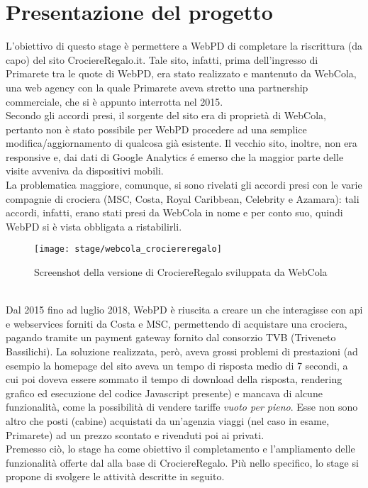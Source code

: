 \section{Presentazione del progetto}
L'obiettivo di questo stage è permettere a WebPD di completare la riscrittura (da capo) del sito CrociereRegalo.it. Tale sito, infatti, prima dell'ingresso di Primarete tra le quote di WebPD, era stato realizzato e mantenuto da WebCola, una web agency con la quale Primarete aveva stretto una partnership commerciale, che si è appunto interrotta nel 2015.\\
Secondo gli accordi presi, il sorgente del sito era di proprietà di WebCola, pertanto non è stato possibile per WebPD procedere ad una semplice modifica/aggiornamento di qualcosa già esistente. Il vecchio sito, inoltre, non era responsive e, dai dati di Google Analytics é emerso che la maggior parte delle visite avveniva da dispositivi mobili. \\
La problematica maggiore, comunque, si sono rivelati gli accordi presi con le varie compagnie di crociera (MSC, Costa, Royal Caribbean, Celebrity e Azamara): tali accordi, infatti, erano stati presi da WebCola in nome e per conto suo, quindi WebPD si è vista obbligata a ristabilirli.
\begin{figure}[!h] 
	\centering 
	\texttt{[image: stage/webcola\_crociereregalo]} 
	\caption{Screenshot della versione di CrociereRegalo sviluppata da WebCola}
\end{figure}\\
Dal 2015 fino ad luglio 2018, WebPD è riuscita a creare un \bookingEngine che interagisse con \Gls{api} e \glspl{webservice} forniti da Costa e MSC, permettendo di acquistare una crociera, pagando tramite un payment gateway fornito dal consorzio TVB (Triveneto Bassilichi). La soluzione realizzata, però, aveva grossi problemi di prestazioni (ad esempio la homepage del sito aveva un tempo di risposta medio di 7 secondi, a cui poi doveva essere sommato il tempo di download della risposta, rendering grafico ed esecuzione del codice Javascript presente) e mancava di alcune funzionalità, come la possibilità di vendere tariffe \textit{vuoto per pieno}. Esse non sono altro che posti (cabine) acquistati da un'agenzia viaggi (nel caso in esame, Primarete) ad un prezzo scontato e rivenduti poi ai privati.
\\
Premesso ciò, lo stage ha come obiettivo il completamento e l'ampliamento delle funzionalità offerte dal \bookingEngine alla base di CrociereRegalo. Più nello specifico, lo stage si propone di svolgere le attività descritte in seguito.

